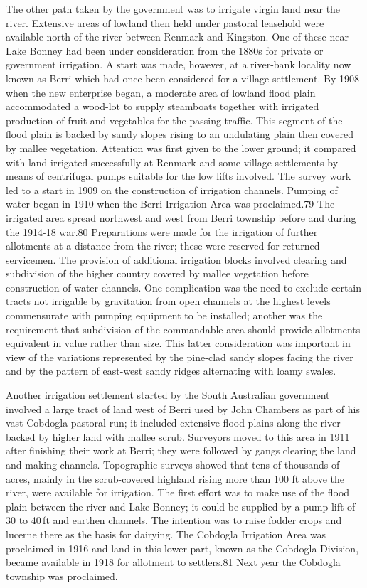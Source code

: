 The other path taken by the government was to irrigate virgin land
near the river.  Extensive areas of lowland then held under pastoral
leasehold were available north of the river between Renmark and
Kingston.  One of these near Lake Bonney had been under consideration
from the 1880s for private or government irrigation.  A start was
made, however, at a river-bank locality now known as Berri which had
once been considered for a village settlement.  By 1908 when the new
enterprise began, a moderate area of lowland flood plain accommodated
a wood-lot to supply steamboats together with irrigated production of
fruit and vegetables for the passing traffic.  This segment of the
flood plain is backed by sandy slopes rising to an undulating plain
then covered by mallee vegetation.  Attention was first given to the
lower ground; it compared with land irrigated successfully at Renmark
and some village settlements by means of centrifugal pumps suitable
for the low lifts involved.  The survey work led to a start in 1909 on
the construction of irrigation channels.  Pumping of water began in
1910 when the Berri Irrigation Area was proclaimed.79 The irrigated
area spread northwest and west from Berri township before and during
the 1914-18 war.80 Preparations were made for the irrigation of
further allotments at a distance from the river; these were reserved
for returned servicemen.  The provision of additional irrigation
blocks involved clearing and subdivision of the higher country covered
by mallee vegetation before construction of water channels.  One
complication was the need to exclude certain tracts not irrigable by
gravitation from open channels at the highest levels commensurate with
pumping equipment to be installed; another was the requirement that
subdivision of the commandable area should provide allotments
equivalent in value rather than size.  This latter consideration was
important in view of the variations represented by the pine-clad sandy
slopes facing the river and by the pattern of east-west sandy ridges
alternating with loamy swales.

Another irrigation settlement started by the South Australian
government involved a large tract of land west of Berri used by John
Chambers as part of his vast Cobdogla pastoral run; it included
extensive flood plains along the river backed by higher land with
mallee scrub.  Surveyors moved to this area in 1911 after finishing
their work at Berri; they were followed by gangs clearing the land and
making channels.  Topographic surveys showed that tens of thousands of
acres, mainly in the scrub-covered highland rising more than 100 ft
above the river, were available for irrigation.  The first effort was
to make use of the flood plain between the river and Lake Bonney; it
could be supplied by a pump lift of 30 to 40\,ft and earthen
channels. The intention was to raise fodder crops and lucerne there as
the basis for dairying.  The Cobdogla Irrigation Area was proclaimed
in 1916 and land in this lower part, known as the Cobdogla Division,
became available in 1918 for allotment to settlers.81 Next year the
Cobdogla township was proclaimed.

